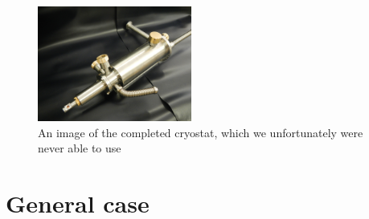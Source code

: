 \documentclass[journal]{IEEEtran}
\begin{document}
\begin{figure}[h]
\centering
\includegraphics[width=0.45\textwidth]{cryostat1}
\caption{An image of the completed cryostat, which we unfortunately were never able to use}
\label{fig:cryostat1}
\end{figure}



%



\label{sec:app}

\section*{General case}
\end{document}
